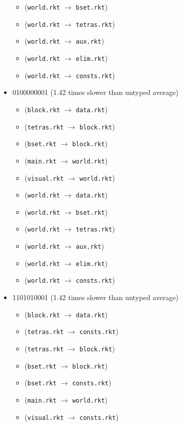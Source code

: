 \documentclass{article}
\newcommand{\mono}[1]{\texttt{#1}}
\begin{document}
\begin{itemize}
\begin{itemize}
  \item (\mono{world.rkt} $\rightarrow$ \mono{bset.rkt})
  \item (\mono{world.rkt} $\rightarrow$ \mono{tetras.rkt})
  \item (\mono{world.rkt} $\rightarrow$ \mono{aux.rkt})
  \item (\mono{world.rkt} $\rightarrow$ \mono{elim.rkt})
  \item (\mono{world.rkt} $\rightarrow$ \mono{consts.rkt})
  \end{itemize}
\item 0100000001 (1.42 times slower than untyped average)
  \begin{itemize}
  \item (\mono{block.rkt} $\rightarrow$ \mono{data.rkt})
  \item (\mono{tetras.rkt} $\rightarrow$ \mono{block.rkt})
  \item (\mono{bset.rkt} $\rightarrow$ \mono{block.rkt})
  \item (\mono{main.rkt} $\rightarrow$ \mono{world.rkt})
  \item (\mono{visual.rkt} $\rightarrow$ \mono{world.rkt})
  \item (\mono{world.rkt} $\rightarrow$ \mono{data.rkt})
  \item (\mono{world.rkt} $\rightarrow$ \mono{bset.rkt})
  \item (\mono{world.rkt} $\rightarrow$ \mono{tetras.rkt})
  \item (\mono{world.rkt} $\rightarrow$ \mono{aux.rkt})
  \item (\mono{world.rkt} $\rightarrow$ \mono{elim.rkt})
  \item (\mono{world.rkt} $\rightarrow$ \mono{consts.rkt})
  \end{itemize}
\item 1101010001 (1.42 times slower than untyped average)
  \begin{itemize}
  \item (\mono{block.rkt} $\rightarrow$ \mono{data.rkt})
  \item (\mono{tetras.rkt} $\rightarrow$ \mono{consts.rkt})
  \item (\mono{tetras.rkt} $\rightarrow$ \mono{block.rkt})
  \item (\mono{bset.rkt} $\rightarrow$ \mono{block.rkt})
  \item (\mono{bset.rkt} $\rightarrow$ \mono{consts.rkt})
  \item (\mono{main.rkt} $\rightarrow$ \mono{world.rkt})
  \item (\mono{visual.rkt} $\rightarrow$ \mono{consts.rkt})

\end{itemize}
\end{itemize}
\end{document}
